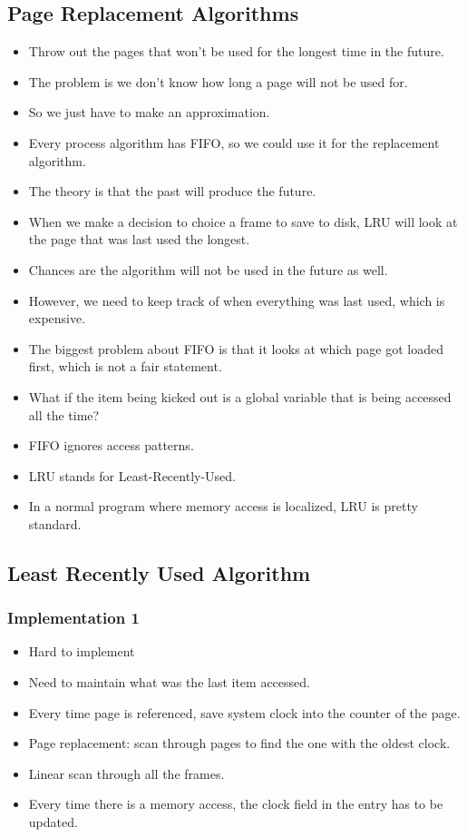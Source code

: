 \documentclass[]{article}
\begin{document}
\subsection{Page Replacement Algorithms}
\begin{itemize}
\item Throw out the pages that won't be used for the longest time in the future.
\item The problem is we don't know how long a page will not be used for.
\item So we just have to make an approximation.
\item Every process algorithm has FIFO, so we could use it for the replacement
algorithm.
\item The theory is that the past will produce the future.
\item When we make a decision to choice a frame to save to disk, LRU will look
at the page that was last used the longest.
\item Chances are the algorithm will not be used in the future as well.
\item However, we need to keep track of when everything was last used, which is
expensive.
\item The biggest problem about FIFO is that it looks at which page got loaded
first, which is not a fair statement.
\item What if the item being kicked out is a global variable that is being
accessed all the time?
\item FIFO ignores access patterns.
\item LRU stands for Least-Recently-Used.
\item In a normal program where memory access is localized, LRU is pretty
standard.
\end{itemize}

\subsection{Least Recently Used Algorithm}
\subsubsection{Implementation 1}
\begin{itemize}
\item Hard to implement
\item Need to maintain what was the last item accessed.
\item Every time page is referenced, save system clock into the counter of the
page.
\item Page replacement: scan through pages to find the one with the oldest
clock.
\item Linear scan through all the frames.
\item Every time there is a memory access, the clock field in the entry has to
be updated.
\end{itemize}
\end{document}
